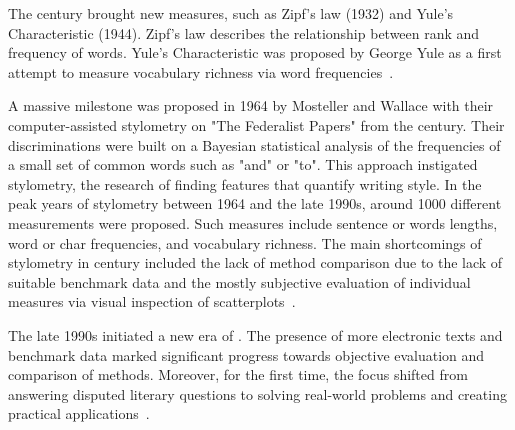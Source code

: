 
The  century brought new measures, such as Zipf's law (1932) and Yule's Characteristic (1944).
Zipf's law describes the relationship between rank and frequency of words.
Yule's Characteristic was proposed by George Yule as a first attempt to measure vocabulary richness via word frequencies~\citep{neal_surveying_2018,stamatatos_survey_2009}.

A massive milestone was proposed in 1964 by Mosteller and Wallace with their computer-assisted stylometry on "The Federalist Papers" from the  century.
Their discriminations were built on a Bayesian statistical analysis of the frequencies of a small set of common words such as "and" or "to".
This approach instigated stylometry, the research of finding features that quantify writing style.
In the peak years of stylometry between 1964 and the late 1990s, around \num{1000} different measurements were proposed.
Such measures include sentence or words lengths, word or char frequencies, and vocabulary richness.
The main shortcomings of stylometry in  century included the lack of method comparison due to the lack of suitable benchmark data and the mostly subjective evaluation of individual measures via visual inspection of scatterplots~\citep{stamatatos_survey_2009}.

The late 1990s initiated a new era of \ai{}.
The presence of more electronic texts and benchmark data marked significant progress towards objective evaluation and comparison of methods.
Moreover, for the first time, the focus shifted from answering disputed literary questions to solving real-world problems and creating practical applications~\citep{stamatatos_survey_2009}.




